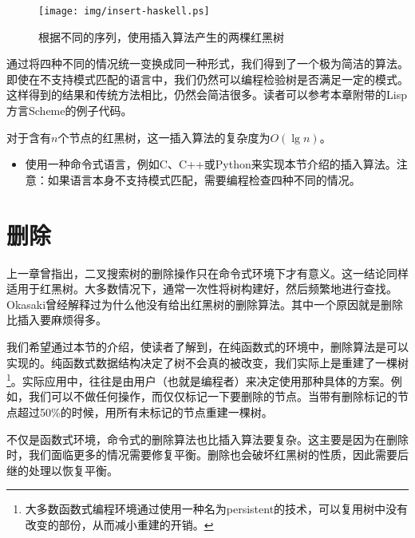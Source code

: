 \documentclass[UTF8]{article}
\begin{document}
\begin{figure}[htbp]
  \centering
  \texttt{[image: img/insert-haskell.ps]}
  \caption{根据不同的序列，使用插入算法产生的两棵红黑树} \label{fig:insert-example}
\end{figure}

通过将四种不同的情况统一变换成同一种形式，我们得到了一个极为简洁的算法。即使在不支持模式匹配的语言中，我们仍然可以编程检验树是否满足一定的模式。这样得到的结果和传统方法相比，仍然会简洁很多。读者可以参考本章附带的Lisp方言Scheme的例子代码。

对于含有$n$个节点的红黑树，这一插入算法的复杂度为$O(\lg n)$。

\begin{Exercise}

\begin{itemize}
\item 使用一种命令式语言，例如C、C++或Python来实现本节介绍的插入算法。注意：如果语言本身不支持模式匹配，需要编程检查四种不同的情况。
\end{itemize}

\end{Exercise}


\section{删除}

上一章曾指出，二叉搜索树的删除操作只在命令式环境下才有意义。这一结论同样适用于红黑树。大多数情况下，通常一次性将树构建好，然后频繁地进行查找。Okasaki曾经解释过为什么他没有给出红黑树的删除算法\cite{okasaki-blog}。其中一个原因就是删除比插入要麻烦得多。

我们希望通过本节的介绍，使读者了解到，在纯函数式的环境中，删除算法是可以实现的。纯函数式数据结构决定了树不会真的被改变，我们实际上是重建了一棵树\footnote{大多数函数式编程环境通过使用一种名为persistent的技术，可以复用树中没有改变的部份，从而减小重建的开销。}。实际应用中，往往是由用户（也就是编程者）来决定使用那种具体的方案。例如，我们可以不做任何操作，而仅仅标记一下要删除的节点。当带有删除标记的节点超过50\%的时候，用所有未标记的节点重建一棵树。

不仅是函数式环境，命令式的删除算法也比插入算法要复杂。这主要是因为在删除时，我们面临更多的情况需要修复平衡。删除也会破坏红黑树的性质，因此需要后继的处理以恢复平衡。
\end{document}
